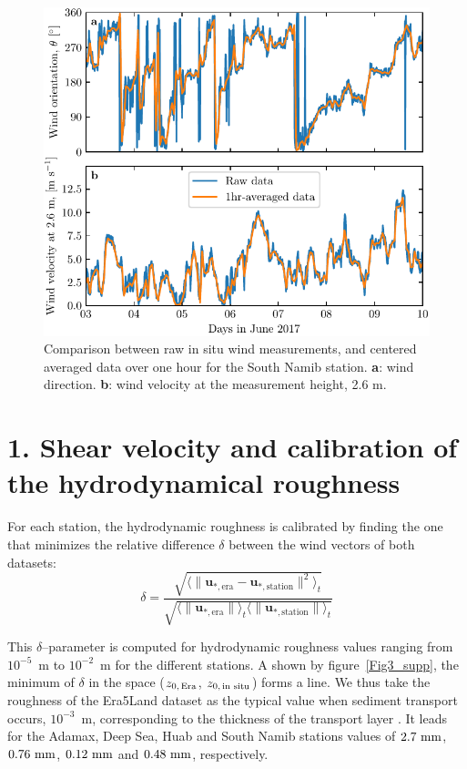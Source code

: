 \begin{figure}
  \centering
  \includegraphics[scale=1]{Figures/Figure2_supp.pdf}
  \caption{Comparison between raw in situ wind measurements, and centered averaged data over one hour for the South Namib station. \textbf{a}: wind direction. \textbf{b}: wind velocity at the measurement height, 2.6 m.}
  \label{Fig2_supp}
\end{figure}

\section*{1. Shear velocity and calibration of the hydrodynamical roughness}
\label{calib_z0}

For each station, the hydrodynamic roughness is calibrated by finding the one that minimizes the relative difference $\delta$ between the wind vectors of both datasets:
\begin{equation}
  \label{metric_roughness}
      \delta = \frac{\sqrt{\langle\| \boldsymbol{u}_{*, \textrm{era}} - \boldsymbol{u}_{*, \textrm{station}} \|^{2}\rangle_{t}}}{\sqrt{ \langle \| \boldsymbol{u}_{*, \textrm{era}} \| \rangle_{t}\langle \| \boldsymbol{u}_{*, \textrm{station}} \| \rangle_{t}}}
\end{equation}



This $\delta$--parameter is computed for hydrodynamic roughness values ranging from $10^{-5}$~m to $10^{-2}$~m for the different stations. A shown by figure~\ref{Fig3_supp}, the minimum of $\delta$ in the space ($z_{0,\, \textup{Era}}$, $z_{0,\, \textup{in situ}}$) forms a line. We thus take the roughness of the Era5Land dataset as the typical value when sediment transport occurs, $10^{-3}$~m, corresponding to the thickness of the transport layer \citep{Sherman2007}. It leads for the Adamax, Deep Sea, Huab and South Namib stations values of $2.7~\textup{mm}$, $0.76~\textup{mm}$, $0.12~\textup{mm}$ and $0.48~\textup{mm}$, respectively.

